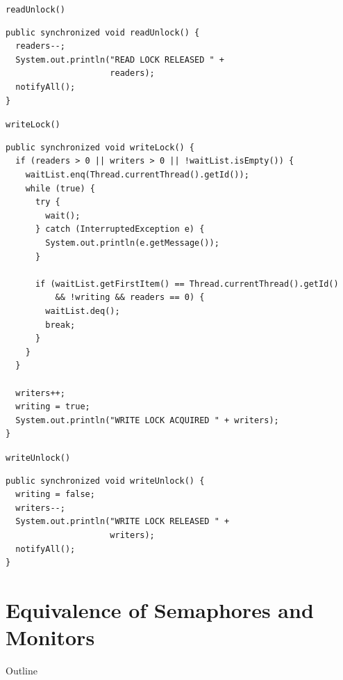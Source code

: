 \begin{frame}[fragile]{\lstinline!readUnlock()!}
\begin{lstlisting}
public synchronized void readUnlock() {
  readers--;
  System.out.println("READ LOCK RELEASED " + 
                     readers);
  notifyAll();
}
\end{lstlisting}
\end{frame}

\begin{frame}[fragile]{\lstinline!writeLock()!}
\begin{lstlisting}[basicstyle=\fontsize{7}{9}\selectfont\ttfamily]
public synchronized void writeLock() {
  if (readers > 0 || writers > 0 || !waitList.isEmpty()) {
    waitList.enq(Thread.currentThread().getId());
    while (true) {
      try {
        wait();
      } catch (InterruptedException e) {
        System.out.println(e.getMessage());
      }

      if (waitList.getFirstItem() == Thread.currentThread().getId()
          && !writing && readers == 0) {
        waitList.deq();
        break;
      }
    }
  }
  
  writers++;
  writing = true;
  System.out.println("WRITE LOCK ACQUIRED " + writers);
}
\end{lstlisting}
\end{frame}

\begin{frame}[fragile]{\lstinline!writeUnlock()!}
\begin{lstlisting}
public synchronized void writeUnlock() {
  writing = false;
  writers--;    
  System.out.println("WRITE LOCK RELEASED " + 
                     writers);
  notifyAll();
}
\end{lstlisting}
\end{frame}


\section{Equivalence of Semaphores and Monitors}

\begin{frame}{Outline}
  \tableofcontents[current]
\end{frame}

